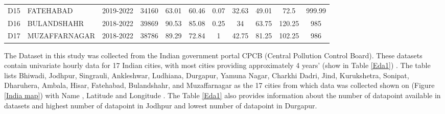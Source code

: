 \documentclass[a4paper,fleqn]{cas-dc}
\begin{document}
\begin{table}[h!]
\begin{tabular}{llccccccccc}
 D15 &  FATEHABAD      & 2019-2022 & 34160 & 63.01 & 60.46 & 0.07 & 32.63   & 49.01       & 72.5    & 999.99 \\
 D16 &  BULANDSHAHR  & 2018-2022 & 39869  & 90.53 & 85.08 & 0.25 & 34      & 63.75       & 120.25  & 985    \\ 
 D17 &  MUZAFFARNAGAR  & 2018-2022 & 38786 & 89.29 & 72.84  & 1    & 42.75   & 81.25       & 102.25  & 986    \\ \hline
  \end{tabular}
  \end{table}
  
The Dataset in this study was collected from the Indian government portal CPCB (Central Pollution Control Board). These datasets contain univariate hourly data for 17 Indian cities, with most cities providing approximately 4 years' (show in Table \ref{Eda1}) . The table lists Bhiwadi, Jodhpur, Singrauli, Ankleshwar, Ludhiana, Durgapur, Yamuna Nagar, Charkhi Dadri, Jind, Kurukshetra, Sonipat, Dharuhera, Ambala, Hisar, Fatehabad, Bulandshahr, and Muzaffarnagar as the 17 cities from which data was collected shown on (Figure \ref{India map}) with Name , Latitude and Longitude . The Table \ref{Eda1} also provides information about the number of datapoint available in datasets and  highest number of datapoint in Jodhpur and lowest number of datapoint in Durgapur.
\end{document}
